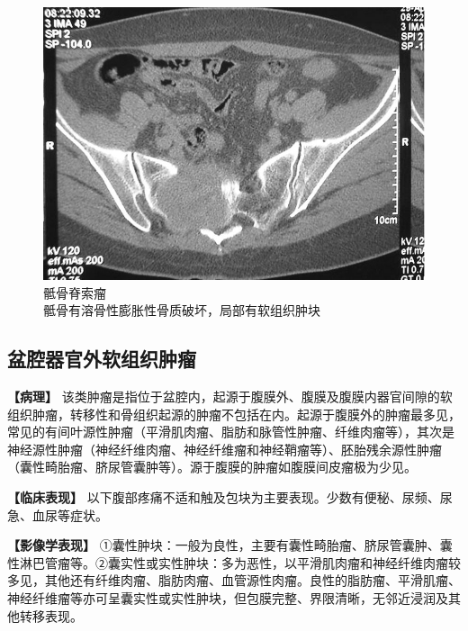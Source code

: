 \begin{figure}[!htbp]
 \centering
 \includegraphics[width=.7\textwidth,height=\textheight,keepaspectratio]{./images/Image00416.jpg}
 \captionsetup{justification=centering}
 \caption{骶骨脊索瘤\\{\small 骶骨有溶骨性膨胀性骨质破坏，局部有软组织肿块}}
 \label{fig21-17}
  \end{figure} 

\subsection{盆腔器官外软组织肿瘤}

\textbf{【病理】}
该类肿瘤是指位于盆腔内，起源于腹膜外、腹膜及腹膜内器官间隙的软组织肿瘤，转移性和骨组织起源的肿瘤不包括在内。起源于腹膜外的肿瘤最多见，常见的有间叶源性肿瘤（平滑肌肉瘤、脂肪和脉管性肿瘤、纤维肉瘤等），其次是神经源性肿瘤（神经纤维肉瘤、神经纤维瘤和神经鞘瘤等）、胚胎残余源性肿瘤（囊性畸胎瘤、脐尿管囊肿等）。源于腹膜的肿瘤如腹膜间皮瘤极为少见。

\textbf{【临床表现】}
以下腹部疼痛不适和触及包块为主要表现。少数有便秘、尿频、尿急、血尿等症状。

\textbf{【影像学表现】}
①囊性肿块：一般为良性，主要有囊性畸胎瘤、脐尿管囊肿、囊性淋巴管瘤等。②囊实性或实性肿块：多为恶性，以平滑肌肉瘤和神经纤维肉瘤较多见，其他还有纤维肉瘤、脂肪肉瘤、血管源性肉瘤。良性的脂肪瘤、平滑肌瘤、神经纤维瘤等亦可呈囊实性或实性肿块，但包膜完整、界限清晰，无邻近浸润及其他转移表现。

\protect\hypertarget{text00029.html}{}{}

